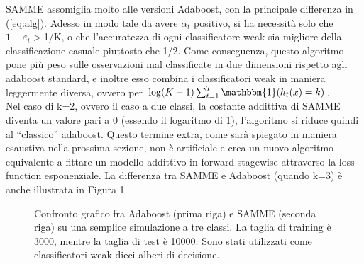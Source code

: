 SAMME assomiglia molto alle versioni Adaboost, con la principale differenza in (\ref{eq:alg}). 
Adesso in modo tale da avere \begin{math}\alpha_t\end{math} positivo, 
si ha necessit\`a solo che \begin{math}1-\varepsilon_t >\end{math}1/K, o che l'accuratezza di 
ogni classificatore weak sia migliore della classificazione casuale piuttosto che 1/2. 
Come conseguenza, questo algoritmo pone pi\`u peso sulle osservazioni mal classificate in due dimensioni 
rispetto agli adaboost standard, e inoltre esso combina i classificatori weak in maniera leggermente diversa, 
ovvero per \begin{math}\log(K-1)\sum_{t=1}^T \mathbbm{1}(h_t(x) = k)\end{math}.\\
\newline
Nel caso di k=2, ovvero il caso a due classi, la costante addittiva di SAMME diventa un valore pari a 0 
(essendo il logaritmo di 1), 
l'algoritmo si riduce quindi al ``classico'' adaboost. Questo termine extra, come sar\`a spiegato in maniera 
esaustiva nella prossima sezione, non \`e artificiale e crea un nuovo algoritmo 
equivalente a fittare un modello addittivo in forward 
stagewise attraverso la loss function esponenziale. La differenza tra SAMME e Adaboost (quando k=3) 
\`e anche illustrata in Figura 1.\\

\vspace{1.5cm}
\begin{figure}
 \caption{Confronto grafico fra Adaboost (prima riga) 
e SAMME (seconda riga) su una semplice simulazione a tre classi. La taglia di 
training \`e 3000, mentre la taglia di test \`e 10000. Sono stati utilizzati come classificatori weak dieci 
alberi di decisione.}
 \label{fig:key}
\end{figure}

